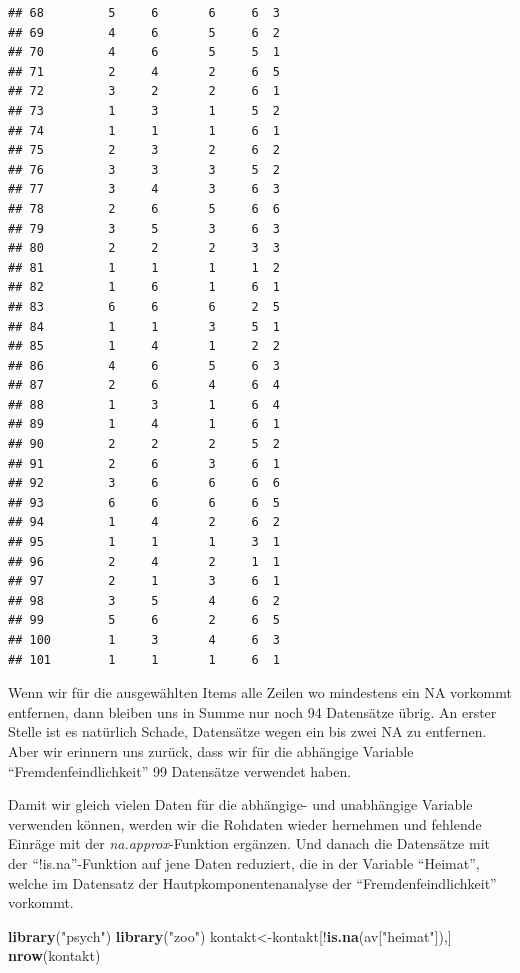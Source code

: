 \documentclass[]{article}
\newenvironment{Shaded}{\begin{snugshade}}{\end{snugshade}}
\newcommand{\KeywordTok}[1]{\textcolor[rgb]{0.13,0.29,0.53}{\textbf{{#1}}}}
\newcommand{\StringTok}[1]{\textcolor[rgb]{0.31,0.60,0.02}{{#1}}}
\newcommand{\NormalTok}[1]{{#1}}
\begin{document}
\begin{verbatim}
## 68         5     6       6     6  3
## 69         4     6       5     6  2
## 70         4     6       5     5  1
## 71         2     4       2     6  5
## 72         3     2       2     6  1
## 73         1     3       1     5  2
## 74         1     1       1     6  1
## 75         2     3       2     6  2
## 76         3     3       3     5  2
## 77         3     4       3     6  3
## 78         2     6       5     6  6
## 79         3     5       3     6  3
## 80         2     2       2     3  3
## 81         1     1       1     1  2
## 82         1     6       1     6  1
## 83         6     6       6     2  5
## 84         1     1       3     5  1
## 85         1     4       1     2  2
## 86         4     6       5     6  3
## 87         2     6       4     6  4
## 88         1     3       1     6  4
## 89         1     4       1     6  1
## 90         2     2       2     5  2
## 91         2     6       3     6  1
## 92         3     6       6     6  6
## 93         6     6       6     6  5
## 94         1     4       2     6  2
## 95         1     1       1     3  1
## 96         2     4       2     1  1
## 97         2     1       3     6  1
## 98         3     5       4     6  2
## 99         5     6       2     6  5
## 100        1     3       4     6  3
## 101        1     1       1     6  1
\end{verbatim}

Wenn wir für die ausgewählten Items alle Zeilen wo mindestens ein NA
vorkommt entfernen, dann bleiben uns in Summe nur noch 94 Datensätze
übrig. An erster Stelle ist es natürlich Schade, Datensätze wegen ein
bis zwei NA zu entfernen. Aber wir erinnern uns zurück, dass wir für die
abhängige Variable ``Fremdenfeindlichkeit'' 99 Datensätze verwendet
haben.

Damit wir gleich vielen Daten für die abhängige- und unabhängige
Variable verwenden können, werden wir die Rohdaten wieder hernehmen und
fehlende Einräge mit der \emph{na.approx}-Funktion ergänzen. Und danach
die Datensätze mit der ``!is.na''-Funktion auf jene Daten reduziert, die
in der Variable ``Heimat'', welche im Datensatz der
Hautpkomponentenanalyse der ``Fremdenfeindlichkeit'' vorkommt.

\begin{Shaded}
\begin{Highlighting}[]
\KeywordTok{library}\NormalTok{(}\StringTok{"psych"}\NormalTok{)}
\KeywordTok{library}\NormalTok{(}\StringTok{"zoo"}\NormalTok{)}
\NormalTok{kontakt<-kontakt[!}\KeywordTok{is.na}\NormalTok{(av[}\StringTok{"heimat"}\NormalTok{]),]}
\KeywordTok{nrow}\NormalTok{(kontakt)}
\end{Highlighting}
\end{Shaded}
\end{document}
